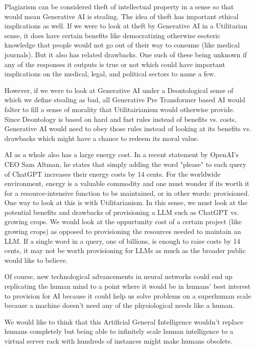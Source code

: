 \documentclass[letterpaper,11pt,leqno]{article}
\begin{document}
Plagiarism can be considered theft of intellectual property in a sense so that would mean Generative AI is stealing. The idea of theft has important ethical implications as well. If we were to look at theft by Generative AI in a Utilitarian sense, it does have certain benefits like democratizing otherwise esoteric knowledge that people would not go out of their way to consume (like medical journals). But it also has related drawbacks. One such of these being unknown if any of the responses it outputs is true or not which could have important implications on the medical, legal, and political sectors to name a few. 

However, if we were to look at Generative AI under a Deontological sense of which we define stealing as bad, all Generative Pre Transformer based AI would falter to fill a sense of morality that Utilitairianism would otherwise provide. Since Deontology is based on hard and fast rules instead of benefits vs. costs, Generative AI would need to obey those rules instead of looking at its benefits vs. drawbacks which might have a chance to redeem its moral value. 

AI as a whole also has a large energy cost. In a recent statement by OpenAI's CEO Sam Altman, he states that simply adding the word "please" to each query of ChatGPT increases their energy costs by 14 cents. For the worldwide environment, energy is a valuable commodity and one must wonder if its worth it for a resource-intensive function to be maintained, or in other words: provisioned. One way to look at this is with Utilitarianism. In this sense, we must look at the potential benefits and drawbacks of provisioning a LLM such as ChatGPT vs. growing crops. We would look at the oppurtunity cost of a certain project (like growing crops) as opposed to provisioning the resources needed to maintain an LLM. If a single word in a query, one of billions, is enough to raise costs by 14 cents, it may not be worth provisioning for LLMs as much as the broader public would like to believe. 

Of course, new technological advancements in neural networks could end up replicating the human mind to a point where it would be in humans' best interest to provision for AI because it could help us solve problems on a superhuman scale because a machine doesn't need any of the physiological needs like a human.

We would like to think that this Artificial General Intelligence wouldn't replace humans completely but being able to infinitely scale human intelligence to a virtual server rack with hundreds of instances might make humans obsolete. 
\end{document}
